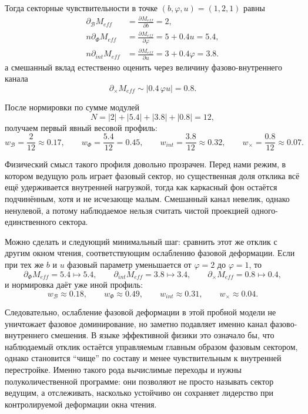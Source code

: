 \documentclass[12pt,a4paper]{article}
\begin{document}
Тогда секторные чувствительности в точке \((b,\varphi,u)=(1,2,1)\) равны
\begin{align}
\partial_{\mathcal{B}}M_{eff} &= \frac{\partial M_{eff}}{\partial b}=2, \\n\partial_{\Phi}M_{eff} &= \frac{\partial M_{eff}}{\partial \varphi}=5+0.4u=5.4, \\n\partial_{int}M_{eff} &= \frac{\partial M_{eff}}{\partial u}=3+0.4\varphi=3.8.
\end{align}
а смешанный вклад естественно оценить через величину фазово-внутреннего канала
\begin{equation}
\partial_{\times}M_{eff}\sim \left|0.4\,\varphi u\right|=0.8.
\end{equation}

После нормировки по сумме модулей
\begin{equation}
N=|2|+|5.4|+|3.8|+|0.8|=12,
\end{equation}
получаем первый явный весовой профиль:
\begin{equation}
w_{\mathcal{B}}=\frac{2}{12}\approx 0.17,
\qquad
w_{\Phi}=\frac{5.4}{12}=0.45,
\qquad
w_{int}=\frac{3.8}{12}\approx 0.32,
\qquad
w_{\times}=\frac{0.8}{12}\approx 0.07.
\end{equation}

Физический смысл такого профиля довольно прозрачен. Перед нами режим, в котором ведущую роль играет фазовый сектор, но существенная доля отклика всё ещё удерживается внутренней нагрузкой, тогда как каркасный фон остаётся подчинённым, хотя и не исчезающе малым. Смешанный канал невелик, однако ненулевой, а потому наблюдаемое нельзя считать чистой проекцией одного-единственного сектора.

Можно сделать и следующий минимальный шаг: сравнить этот же отклик с другим окном чтения, соответствующим ослаблению фазовой деформации. Если при тех же \(b\) и \(u\) фазовый параметр уменьшается от \(\varphi=2\) до \(\varphi=1\), то
\begin{equation}
\partial_{\Phi}M_{eff}=5.4 \mapsto 5.4,
\qquad
\partial_{int}M_{eff}=3.8 \mapsto 3.4,
\qquad
\partial_{\times}M_{eff}=0.8 \mapsto 0.4,
\end{equation}
и нормировка даёт уже иной профиль:
\begin{equation}
w_{\mathcal{B}}\approx 0.18,
\qquad
w_{\Phi}\approx 0.49,
\qquad
w_{int}\approx 0.31,
\qquad
w_{\times}\approx 0.04.
\end{equation}

Следовательно, ослабление фазовой деформации в этой пробной модели не уничтожает фазовое доминирование, но заметно подавляет именно канал фазово-внутреннего смешения. В языке эффективной физики это означало бы, что наблюдаемый отклик остаётся управляемым главным образом фазовым сектором, однако становится ``чище'' по составу и менее чувствительным к внутренней перестройке. Именно такого рода вычислимые переходы и нужны полуколичественной программе: они позволяют не просто называть сектор ведущим, а отслеживать, насколько устойчиво он сохраняет лидерство при контролируемой деформации окна чтения.
\end{document}
